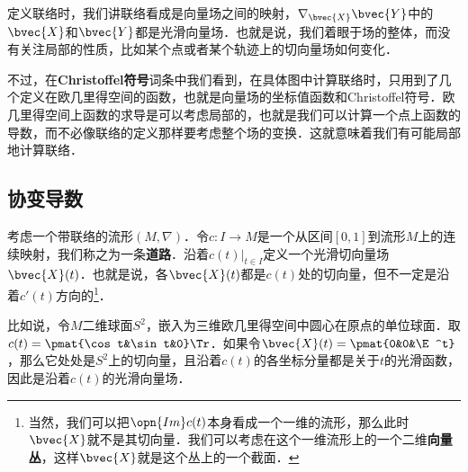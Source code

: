 

定义联络时，我们讲联络看成是向量场之间的映射，$\nabla_\bvec{X}\bvec{Y}$中的$\bvec{X}$和$\bvec{Y}$都是光滑向量场．也就是说，我们着眼于场的整体，而没有关注局部的性质，比如某个点或者某个轨迹上的切向量场如何变化．

不过，在\textbf{Christoffel符号}词条中我们看到，在具体图中计算联络时，只用到了几个定义在欧几里得空间的函数，也就是向量场的坐标值函数和Christoffel符号．欧几里得空间上函数的求导是可以考虑局部的，也就是我们可以计算一个点上函数的导数，而不必像联络的定义那样要考虑整个场的变换．这就意味着我们有可能局部地计算联络．

\subsection{协变导数}

考虑一个带联络的流形$(M, \nabla)$．令$c:I\to M$是一个从区间$[0, 1]$到流形$M$上的连续映射，我们称之为一条\textbf{道路}．沿着$c(t)|_{t\in I}$定义一个光滑切向量场$\bvec{X}(t)$．也就是说，各$\bvec{X}(t)$都是$c(t)$处的切向量，但不一定是沿着$c'(t)$方向的\footnote{当然，我们可以把$\opn{Im}c(t)$本身看成一个一维的流形，那么此时$\bvec{X}$就不是其切向量．我们可以考虑在这个一维流形上的一个二维\textbf{向量丛}，这样$\bvec{X}$就是这个丛上的一个截面．}．

比如说，令$M$二维球面$S^2$，嵌入为三维欧几里得空间中圆心在原点的单位球面．取$c(t)=\pmat{\cos t&\sin t&0}\Tr$．如果令$\bvec{X}(t)=\pmat{0&0&\E^t}$，那么它处处是$S^2$上的切向量，且沿着$c(t)$的各坐标分量都是关于$t$的光滑函数，因此是沿着$c(t)$的光滑向量场．






















